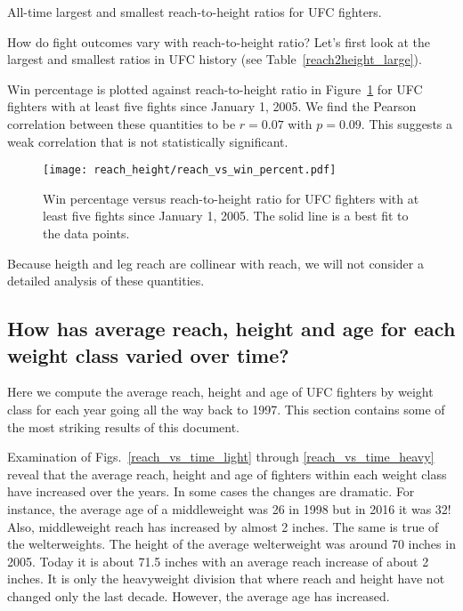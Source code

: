 \begin{center}
\begin{table}[h]

\caption{All-time largest and smallest reach-to-height ratios for UFC fighters.}
\label{reach2height_large}
\end{table}
\end{center}

How do fight outcomes vary with reach-to-height ratio? Let's first look
at the largest and smallest ratios in UFC history (see
Table~\ref{reach2height_large}).

\clearpage

Win percentage is plotted against reach-to-height ratio in
Figure~\ref{reach_vs_win_percent} for UFC
fighters with at least five fights since January 1, 2005.
We find the Pearson correlation between these quantities
to be $r=0.07$ with $p=0.09$. This suggests
a weak correlation that is not statistically significant.

\begin{figure}[h]
\begin{center}
\texttt{[image: reach\_height/reach\_vs\_win\_percent.pdf]}
\caption{Win percentage versus reach-to-height ratio for UFC
fighters with at least five fights since January 1, 2005. The solid line
is a best fit to the data points.}
\label{reach_vs_win_percent}
\end{center}
\end{figure}

Because heigth and leg reach are collinear with reach, we will not
consider a detailed analysis of these quantities.

\clearpage
\subsection*{How has average reach, height and age for each weight class varied over time?}

Here we compute the average reach, height and age of UFC fighters
by weight class
for each year going all the way back to 1997. This section
contains some of the most striking results of this document.

Examination of Figs.~\ref{reach_vs_time_light} through
\ref{reach_vs_time_heavy} reveal that the average reach,
height and age of fighters within each weight class
have increased over the years. In some cases the changes
are dramatic.
For instance, the average age of a middleweight was
26 in 1998 but in 2016 it was 32! Also, middleweight reach
has increased by almost 2 inches. The same is true of
the welterweights.
The height of the average welterweight was around 70 inches in 2005.
Today it is about 71.5 inches with an average reach increase of
about 2 inches. It is only the heavyweight division that where
reach and height have not changed only the last decade. However,
the average age has increased.


